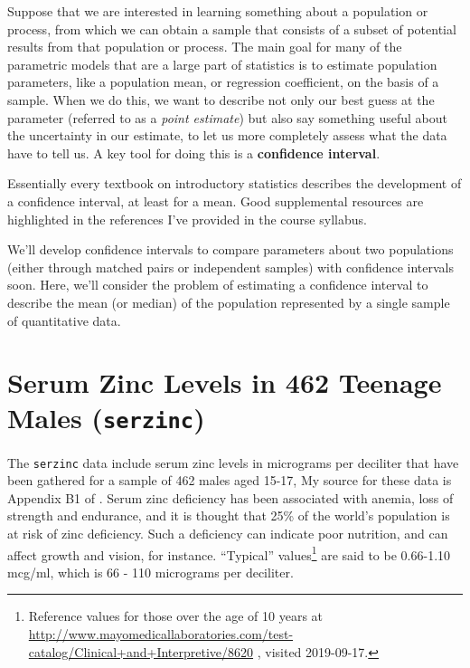\documentclass[
]{book}
\begin{document}
Suppose that we are interested in learning something about a population or process, from which we can obtain a sample that consists of a subset of potential results from that population or process. The main goal for many of the parametric models that are a large part of statistics is to estimate population parameters, like a population mean, or regression coefficient, on the basis of a sample. When we do this, we want to describe not only our best guess at the parameter (referred to as a \emph{point estimate}) but also say something useful about the uncertainty in our estimate, to let us more completely assess what the data have to tell us. A key tool for doing this is a \textbf{confidence interval}.

Essentially every textbook on introductory statistics describes the development of a confidence interval, at least for a mean. Good supplemental resources are highlighted in the references I've provided in the course syllabus.

We'll develop confidence intervals to compare parameters about two populations (either through matched pairs or independent samples) with confidence intervals soon. Here, we'll consider the problem of estimating a confidence interval to describe the mean (or median) of the population represented by a single sample of quantitative data.

\hypertarget{serum-zinc-levels-in-462-teenage-males-serzinc}{%
\section{\texorpdfstring{Serum Zinc Levels in 462 Teenage Males (\texttt{serzinc})}{Serum Zinc Levels in 462 Teenage Males (serzinc)}}\label{serum-zinc-levels-in-462-teenage-males-serzinc}}

The \texttt{serzinc} data include serum zinc levels in micrograms per deciliter that have been gathered for a sample of 462 males aged 15-17, My source for these data is Appendix B1 of \citet{PaganoGauvreau}. Serum zinc deficiency has been associated with anemia, loss of strength and endurance, and it is thought that 25\% of the world's population is at risk of zinc deficiency. Such a deficiency can indicate poor nutrition, and can affect growth and vision, for instance. ``Typical'' values\footnote{Reference values for those over the age of 10 years at \url{http://www.mayomedicallaboratories.com/test-catalog/Clinical+and+Interpretive/8620} , visited 2019-09-17.} are said to be 0.66-1.10 mcg/ml, which is 66 - 110 micrograms per deciliter.
\end{document}
